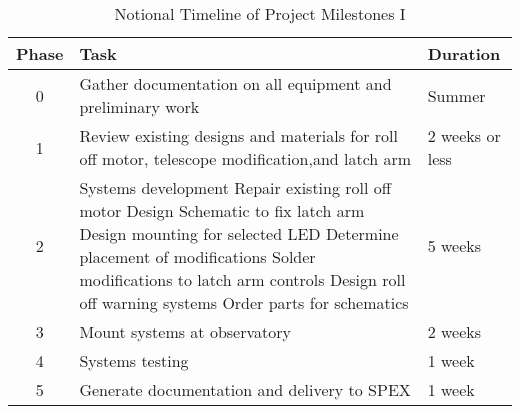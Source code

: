 \documentclass[conference]{IEEEtran} %
\begin{document}
\begin{table}[hb!]
      \caption{Notional Timeline of Project Milestones I}
      \centering
      \begin{tabular}{@{}cll@{}}
          \toprule %
          Phase & Task & Duration \\
          \midrule %
          0 & Gather documentation on all equipment and preliminary work & Summer \\
          1 & Review existing designs and materials for roll off motor, telescope modification,and latch arm & 2 weeks or less \\
          2 & Systems development
          Repair existing roll off motor
          Design Schematic to fix latch arm
          Design mounting for selected LED
          Determine placement of modifications
          Solder modifications to latch arm controls
          Design roll off warning systems
          Order parts for schematics & 5 weeks \\
          3 & Mount systems at observatory & 2 weeks \\
          4 & Systems testing & 1 week \\
          5 & Generate documentation and delivery to SPEX & 1 week \\
          \bottomrule
      \end{tabular}
  \label{tab:timeline1}
  \end{table}
\end{document}
